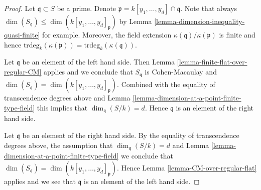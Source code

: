 \documentclass[10pt,a4paper]{amsart}
\theoremstyle{plain}
\theoremstyle{definition}
\theoremstyle{remark}
\numberwithin{equation}{subsection}
\begin{document}
\begin{proof}
Let $\mathfrak q \subset S$ be a prime. Denote
$\mathfrak p = k[y_1, \ldots, y_d] \cap \mathfrak q$.
Note that always
$\dim(S_{\mathfrak q}) \leq \dim(k[y_1, \ldots, y_d]_{\mathfrak p})$
by Lemma \ref{lemma-dimension-inequality-quasi-finite} for example.
Moreover, the field extension $\kappa(\mathfrak q)/\kappa(\mathfrak p)$
is finite and hence
$\text{trdeg}_k(\kappa(\mathfrak p)) = \text{trdeg}_k(\kappa(\mathfrak q))$.

\medskip\noindent
Let $\mathfrak q$ be an element of the left hand side.
Then Lemma \ref{lemma-finite-flat-over-regular-CM} applies
and we conclude that $S_{\mathfrak q}$ is Cohen-Macaulay
and $\dim(S_{\mathfrak q}) = \dim(k[y_1, \ldots, y_d]_{\mathfrak p})$.
Combined with the equality of transcendence degrees above and
Lemma \ref{lemma-dimension-at-a-point-finite-type-field} this
implies that $\dim_{\mathfrak q}(S/k) = d$. Hence $\mathfrak q$
is an element of the right hand side.

\medskip\noindent
Let $\mathfrak q$ be an element of the right hand side.
By the equality of transcendence degrees above, the assumption
that $\dim_{\mathfrak q}(S/k) = d$ and
Lemma \ref{lemma-dimension-at-a-point-finite-type-field}
we conclude that
$\dim(S_{\mathfrak q}) = \dim(k[y_1, \ldots, y_d]_{\mathfrak p})$.
Hence Lemma \ref{lemma-CM-over-regular-flat}
applies and we see that $\mathfrak q$ is an
element of the left hand side.
\end{proof}
\end{document}
